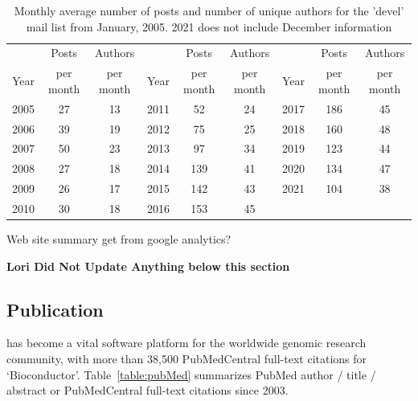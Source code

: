 \documentclass[letterpaper]{article}
\begin{document}
\begin{table}
\begin{center}
\caption{Monthly average number of posts and number of unique authors
  for the \Bioconductor{} 'devel' mail list from January, 2005. 2021 does not
  include December information}
\label{tbl:av_posts}
\begin{tabular}{lcc|lcc|lcc}
  \\
       & Posts     & Authors   &      & Posts     & Authors   &      & Posts     & Authors\\
  Year & per month & per month & Year & per month & per month & Year & per month & per month\\
  \hline\noalign{\smallskip}
  2005 & 27        & 13        & 2011 & 52        & 24        & 2017 & 186 & 45 \\
  2006 & 39        & 19        & 2012 & 75        & 25        & 2018 & 160 & 48 \\
  2007 & 50        & 23        & 2013 & 97        & 34        & 2019 & 123 & 44 \\
  2008 & 27        & 18        & 2014 & 139       & 41        & 2020 & 134 & 47 \\
  2009 & 26        & 17        & 2015 & 142       & 43        & 2021 & 104 & 38 \\
  2010 & 30        & 18        & 2016 & 153       & 45\\
\end{tabular}
\end{center}
\end{table}


Web site summary get from google analytics?


\textbf{Lori Did Not Update Anything below this section}



\subsection{Publication}

\Bioconductor{} has become a vital software platform for the worldwide
genomic research community, with more than 38,500 PubMedCentral
full-text citations for `Bioconductor'. Table~\ref{table:pubMed}
summarizes PubMed author / title / abstract or PubMedCentral full-text
citations since 2003.
\end{document}
